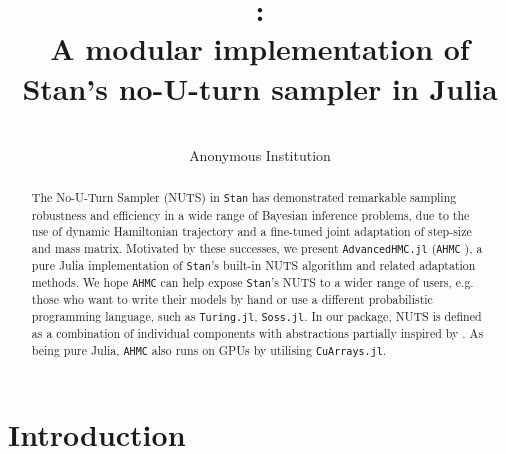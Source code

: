 \documentclass[tablecaption=bottom,wcp]{jmlr} %
\title[\ahmcfull:\\\large A modular implementation of Stan’s no-U-turn sampler]{\ahmcfull:\\\large A modular implementation of Stan’s no-U-turn sampler in Julia}
\author{\Name{Anonymous Authors}\\
  \addr Anonymous Institution}
\def\ahmc{\texttt{AHMC} }
\def\ahmcfull{\texttt{AdvancedHMC.jl} }
\def\stan{\texttt{Stan} }
\def\stans{\texttt{Stan}'s }
\begin{document}
\maketitle

\begin{abstract}
The No-U-Turn Sampler (NUTS) in \stan \citep{hoffman2014no,carpenter2017stan} has demonstrated remarkable sampling robustness and efficiency in a wide range of Bayesian inference problems, due to the use of dynamic Hamiltonian trajectory and a fine-tuned joint adaptation of step-size and mass matrix. Motivated by these successes, we present \ahmcfull (\ahmc), a pure Julia implementation of \stans built-in NUTS algorithm and related adaptation methods. We hope \ahmc can help expose \stans NUTS to a wider range of users, e.g. those who want to write their models by hand or use a different probabilistic programming language, such as \texttt{Turing.jl}, \texttt{Soss.jl}. In our package, NUTS is defined as a combination of individual components with abstractions partially inspired by \citep{betancourt2017conceptual}. As being pure Julia, \ahmc also runs on GPUs by utilising \texttt{CuArrays.jl}.
\end{abstract}


\section{Introduction}
\label{sec:intro}
\end{document}
